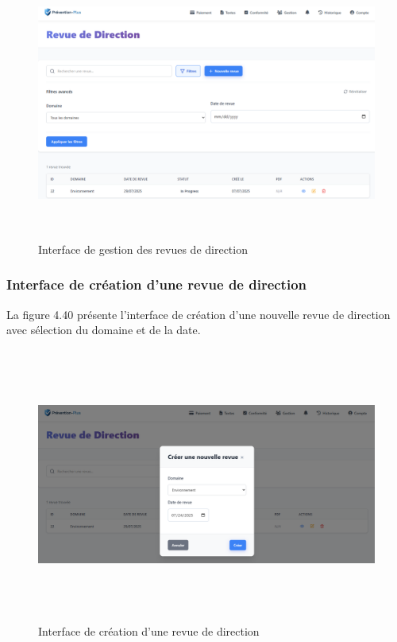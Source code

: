 \begin{figure}[H]
    \centering
    \includegraphics[width=14cm,height=9cm]{images/revuedirectioninterface.PNG}
    \caption{Interface de gestion des revues de direction}
\end{figure}

\subsubsection{Interface de création d'une revue de direction}
\noindent La figure 4.40 présente l'interface de création d'une nouvelle revue de direction avec sélection du domaine et de la date.

\begin{figure}[H]
    \centering
    \includegraphics[width=14cm,height=9cm]{images/createrevuemodal.PNG}
    \caption{Interface de création d'une revue de direction}
\end{figure}

